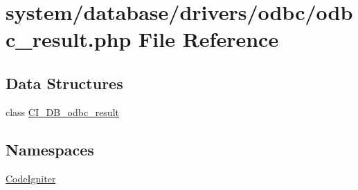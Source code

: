 \hypertarget{odbc__result_8php}{}\section{system/database/drivers/odbc/odbc\+\_\+result.php File Reference}
\label{odbc__result_8php}
\subsection*{Data Structures}
\begin{DoxyCompactItemize}
\item 
class \mbox{\hyperlink{class_c_i___d_b__odbc__result}{C\+I\+\_\+\+D\+B\+\_\+odbc\+\_\+result}}
\end{DoxyCompactItemize}
\subsection*{Namespaces}
\begin{DoxyCompactItemize}
\item 
 \mbox{\hyperlink{namespace_code_igniter}{Code\+Igniter}}
\end{DoxyCompactItemize}
